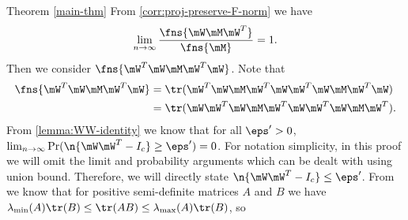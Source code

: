 \begin{proofof}{Theorem \cref{main-thm}}
%
From \cref{corr:proj-preserve-F-norm} we have 
\begin{equation}
    \lim_{n\to\infty}\frac{\fns{\mW\mM\mW^T}}{\fns{\mM}}=1.
\end{equation}
Then we consider $\fns{\mW^T\mW\mM \mW^T\mW}$. Note that
\begin{equation}
\begin{split}
    \fns{\mW^T\mW\mM\mW^T\mW}&=\tr(\mW^T\mW\mM\mW^T\mW\mW^T\mW\mM\mW^T\mW)\\
    &=\tr(\mW\mW^T\mW\mM\mW^T\mW\mW^T\mW\mM\mW^T).
\end{split}
\end{equation}
From \cref{lemma:WW-identity} we know that for all $\eps'>0$, $\lim_{n\to\infty}\Pr(\n{\mW\mW^T-I_c}\geq\eps')=0$. For notation simplicity, in this proof we will omit the limit and probability arguments which can be dealt with using union bound. Therefore, we will directly state $\n{\mW\mW^T-I_c}\leq\eps'$. From \cite{kleinman1968design} we know that for positive semi-definite matrices $A$ and $B$ we have $\lambda_{\min}(A)\tr(B)\leq \tr(AB)\leq \lambda_{\max}(A)\tr(B)$, so

\end{proofof}
